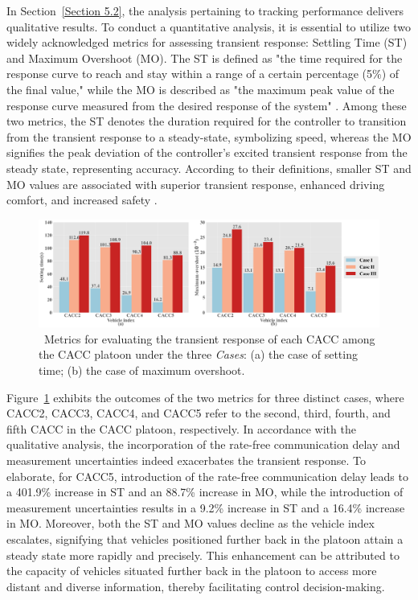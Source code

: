 \documentclass[a4paper]{cas-sc}
\begin{document}
In Section~\ref{Section 5.2}, the analysis pertaining to tracking performance delivers qualitative results. To conduct a quantitative analysis, it is essential to utilize two widely acknowledged metrics for assessing transient response: Settling Time (ST) and Maximum Overshoot (MO). The ST is defined as "the time required for the response curve to reach and stay within a range of a certain percentage (5\%) of the final value," while the MO is described as "the maximum peak value of the response curve measured from the desired response of the system" \citep{ogata1995discrete}. Among these two metrics, the ST denotes the duration required for the controller to transition from the transient response to a steady-state, symbolizing speed, whereas the MO signifies the peak deviation of the controller's excited transient response from the steady state, representing accuracy. According to their definitions, smaller ST and MO values are associated with superior transient response, enhanced driving comfort, and increased safety \citep{na2017active}.

\begin{figure}
  \centering
  \includegraphics[width=\textwidth]{figs/fig4.png}
  \caption
  {~Metrics for evaluating the transient response of each CACC among the CACC platoon under the three \textit{Cases}: (a) the case of setting time; (b) the case of maximum overshoot.} 
  \label{fig4}
\end{figure}

Figure~\ref{fig4} exhibits the outcomes of the two metrics for three distinct cases, where CACC2, CACC3, CACC4, and CACC5 refer to the second, third, fourth, and fifth CACC in the CACC platoon, respectively. In accordance with the qualitative analysis, the incorporation of the rate-free communication delay and measurement uncertainties indeed exacerbates the transient response. To elaborate, for CACC5, introduction of the rate-free communication delay leads to a 401.9\% increase in ST and an 88.7\% increase in MO, while the introduction of measurement uncertainties results in a 9.2\% increase in ST and a 16.4\% increase in MO. Moreover, both the ST and MO values decline as the vehicle index escalates, signifying that vehicles positioned further back in the platoon attain a steady state more rapidly and precisely. This enhancement can be attributed to the capacity of vehicles situated further back in the platoon to access more distant and diverse information, thereby facilitating control decision-making.
\end{document}
